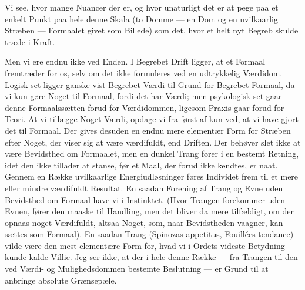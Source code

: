 \documentclass[12pt,a4paper,openany]{book}
\newcommand{\opage}[1]{\marginnote{\footnotesize\textit{[#1]}}}
\newcommand{\whiteline}{\par\vspace{\baselineskip}\par}
\begin{document}
Vi see, hvor mange Nuancer der er, og hvor unaturligt
det er at pege paa et enkelt Punkt paa hele denne Skala (to
Domme --- en Dom og en uvilkaarlig Stræben --- Formaalet
givet som Billede) som det, hvor et helt nyt Begreb skulde
træde i Kraft.

Men vi ere endnu ikke ved Enden. I Begrebet Drift ligger,
at et Formaal fremtræder for os, selv om det ikke formuleres
ved en udtrykkelig Værdidom. Logisk set ligger ganske vist
Begrebet Værdi til Grund for Begrebet Formaal, da vi kun
gøre Noget til Formaal, fordi det har Værdi; men psykologisk
set gaar denne Formaalssætten forud for Værdidommen, ligesom
Praxis gaar forud for Teori. At vi tillægge Noget Værdi,
opdage vi fra først af kun ved, at vi have gjort det til Formaal.
Der gives desuden en endnu mere elementær Form for Stræben
efter Noget, der viser sig at være værdifuldt, end Driften. Der
behøver slet ikke at være Bevidsthed om Formaalet, men en
dunkel Trang fører i en bestemt Retning, idet den ikke tillader
at stanse, før et Maal, der forud ikke kendtes, er naat. Gennem
en Række uvilkaarlige Energiudløsninger føres Individet
frem til et mere eller mindre værdifuldt Resultat. En saadan
Forening af Trang og Evne uden Bevidsthed om Formaal have
vi i Instinktet. (Hvor Trangen forekommer uden Evnen, fører
den maaske til Handling, men det bliver da mere tilfældigt,
\setcounter{footnote}{0}%
\opage{37}om der opnaas noget Værdifuldt, altsaa Noget, som, naar Bevidstheden
vaagner, kan sættes som Formaal). En saadan Trang
(Spinozas appetitus, Fouillées tendance) vilde være den mest
elementære Form for, hvad vi i Ordets videste Betydning kunde
kalde Villie. Jeg ser ikke, at der i hele denne Række --- fra
Trangen til den ved Værdi- og Mulighedsdommen bestemte
Beslutning --- er Grund til at anbringe absolute Grænsepæle.

\whiteline
\end{document}
